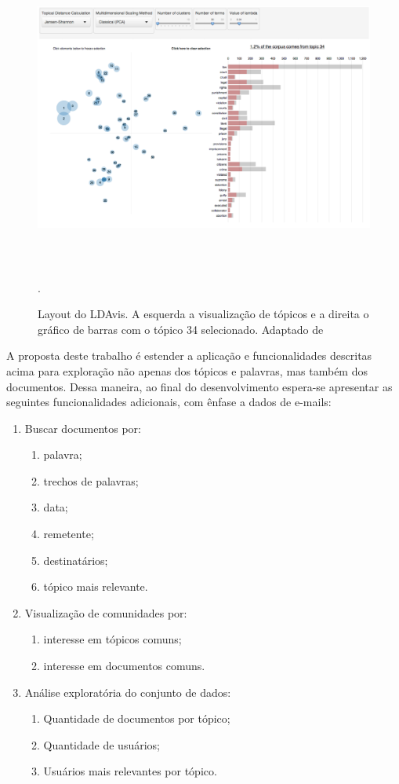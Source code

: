 \documentclass[12pt,a4paper]{article}
\begin{document}
\begin{figure}[H]
	\centering
    \includegraphics[height=10cm]{images/figure_4.png}
    \caption{Layout do LDAvis. A esquerda a visualização de tópicos e a direita o gráfico de barras com o tópico 34 selecionado. Adaptado de \cite{sievert2014ldavis}}.
    \label{fig-ldavis}
\end{figure}


A proposta deste trabalho é estender a aplicação e funcionalidades descritas acima para exploração não apenas dos tópicos e palavras, mas também dos documentos. Dessa maneira, ao final do desenvolvimento espera-se apresentar as seguintes funcionalidades adicionais, com ênfase a dados de e-mails:

\begin{enumerate}
  \item Buscar documentos por:
  \begin{enumerate}
    \item palavra;
    \item trechos de palavras;
    \item data;
    \item remetente;
    \item destinatários;
    \item tópico mais relevante.
  \end{enumerate}
  \item Visualização de comunidades por:
  \begin{enumerate}
    \item interesse em tópicos comuns;
    \item interesse em documentos comuns.
  \end{enumerate}
  \item Análise exploratória do conjunto de dados:
  \begin{enumerate}
    \item Quantidade de documentos por tópico;
    \item Quantidade de usuários;
    \item Usuários mais relevantes por tópico.
  \end{enumerate}
\end{enumerate}
\end{document}
